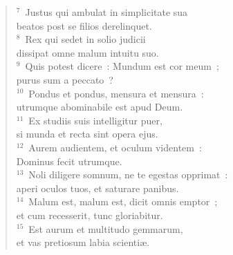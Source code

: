 \begin{flushleft}\begin{verse}${}^{7}$~Justus qui ambulat in simplicitate sua\\ beatos post se filios derelinquet.\\
${}^{8}$~Rex qui sedet in solio judicii\\ dissipat omne malum intuitu suo.\\
${}^{9}$~Quis potest dicere~: Mundum est cor meum~;\\ purus sum a peccato~?\\
${}^{10}$~Pondus et pondus, mensura et mensura~:\\ utrumque abominabile est apud Deum.\\
${}^{11}$~Ex studiis suis intelligitur puer,\\ si munda et recta sint opera ejus.\\
${}^{12}$~Aurem audientem, et oculum videntem~:\\ Dominus fecit utrumque.\\
${}^{13}$~Noli diligere somnum, ne te egestas opprimat~:\\ aperi oculos tuos, et saturare panibus.\\
${}^{14}$~Malum est, malum est, dicit omnis emptor~;\\ et cum recesserit, tunc gloriabitur.\\
${}^{15}$~Est aurum et multitudo gemmarum,\\ et vas pretiosum labia scienti\ae .\end{verse}\end{flushleft}


